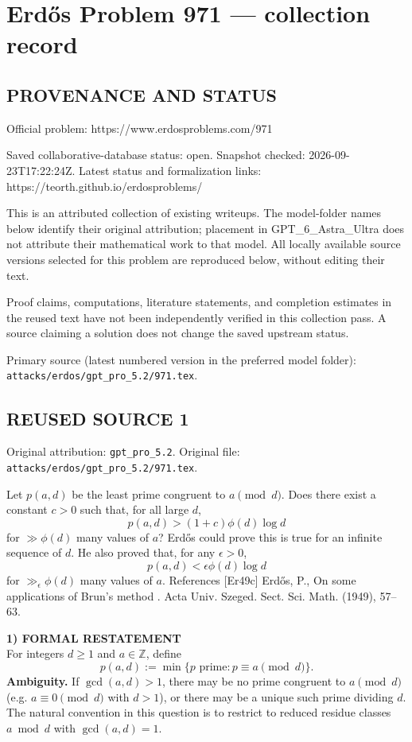\section*{Erd\H{o}s Problem 971 --- collection record}

\subsection*{PROVENANCE AND STATUS}
Official problem: https://www.erdosproblems.com/971

Saved collaborative-database status: open.
Snapshot checked: 2026-09-23T17:22:24Z.
Latest status and formalization links: https://teorth.github.io/erdosproblems/

This is an attributed collection of existing writeups. The model-folder names below identify their original attribution; placement in GPT\_6\_Astra\_Ultra does not attribute their mathematical work to that model. All locally available source versions selected for this problem are reproduced below, without editing their text.

Proof claims, computations, literature statements, and completion estimates in the reused text have not been independently verified in this collection pass. A source claiming a solution does not change the saved upstream status.

Primary source (latest numbered version in the preferred model folder): \texttt{attacks/erdos/gpt\_pro\_5.2/971.tex}.

\subsection*{REUSED SOURCE 1}
Original attribution: \texttt{gpt\_pro\_5.2}.
Original file: \texttt{attacks/erdos/gpt\_pro\_5.2/971.tex}.


Let $p(a,d)$ be the least prime congruent to $a\pmod{d}$. Does there exist a constant $c>0$ such that, for all large $d$,\[p(a,d) > (1+c)\phi(d)\log d\]for $\gg \phi(d)$ many values of $a$? Erd\H{o}s \cite{Er49c} could prove this is true for an infinite sequence of $d$. He also proved that, for any $\epsilon>0$,\[p(a,d)< \epsilon \phi(d)\log d\]for $\gg_\epsilon \phi(d)$ many values of $a$. References [Er49c] Erd\H{o}s, P., On some applications of {B}run's method . Acta Univ. Szeged. Sect. Sci. Math. (1949), 57--63.


\medskip
\noindent\textbf{1) FORMAL RESTATEMENT}\\
For integers $d\ge 1$ and $a\in\mathbb{Z}$, define
\[
 p(a,d):=\min\{p\text{ prime}: p\equiv a\pmod d\}.
\]
\textbf{Ambiguity.} If $\gcd(a,d)>1$, there may be no prime congruent to $a\pmod d$ (e.g. $a\equiv 0\pmod d$ with $d>1$), or there may be a unique such prime dividing $d$.  The natural convention in this question is to restrict to reduced residue classes $a\bmod d$ with $\gcd(a,d)=1$.

